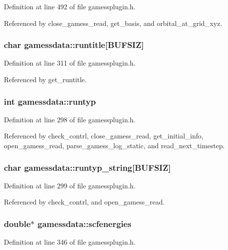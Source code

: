 Definition at line 492 of file gamessplugin.h.

Referenced by close\_\-gamess\_\-read, get\_\-basis, and orbital\_\-at\_\-grid\_\-xyz.
\subsubsection{\setlength{\rightskip}{0pt plus 5cm}char gamessdata::runtitle[BUFSIZ]}\label{structgamessdata_m12}




Definition at line 311 of file gamessplugin.h.

Referenced by get\_\-runtitle.
\subsubsection{\setlength{\rightskip}{0pt plus 5cm}int gamessdata::runtyp}\label{structgamessdata_m2}




Definition at line 298 of file gamessplugin.h.

Referenced by check\_\-contrl, close\_\-gamess\_\-read, get\_\-initial\_\-info, open\_\-gamess\_\-read, parse\_\-gamess\_\-log\_\-static, and read\_\-next\_\-timestep.
\subsubsection{\setlength{\rightskip}{0pt plus 5cm}char gamessdata::runtyp\_\-string[BUFSIZ]}\label{structgamessdata_m3}




Definition at line 299 of file gamessplugin.h.

Referenced by check\_\-contrl, and open\_\-gamess\_\-read.
\subsubsection{\setlength{\rightskip}{0pt plus 5cm}double$\ast$ gamessdata::scfenergies}\label{structgamessdata_m27}




Definition at line 346 of file gamessplugin.h.

